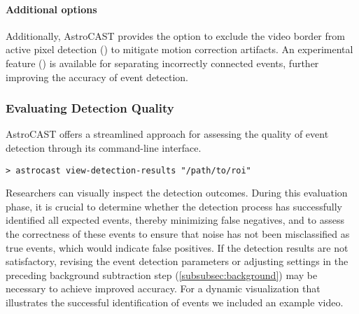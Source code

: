 \paragraph{Additional options}
Additionally, AstroCAST provides the option to exclude the video border from active pixel detection () to mitigate motion correction artifacts. An experimental feature () is available for separating incorrectly connected events, further improving the accuracy of event detection.

\subsubsection{Evaluating Detection Quality}
AstroCAST offers a streamlined approach for assessing the quality of event detection through its command-line interface.

\begin{lstlisting}[style=bashStyle]
    > astrocast view-detection-results "/path/to/roi"
\end{lstlisting}

Researchers can visually inspect the detection outcomes. During this evaluation phase, it is crucial to determine whether the detection process has successfully identified all expected events, thereby minimizing false negatives, and to assess the correctness of these events to ensure that noise has not been misclassified as true events, which would indicate false positives. If the detection results are not satisfactory, revising the event detection parameters or adjusting settings in the preceding background subtraction step (\ref{subsubsec:background}) may be necessary to achieve improved accuracy. For a dynamic visualization that illustrates the successful identification of events we included an example video.
